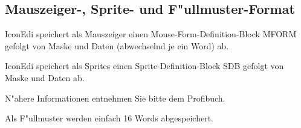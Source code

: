 \begin{appendix}
\subsection{Mauszeiger-, Sprite- und F"ullmuster-Format}
IconEdi speichert als Mauszeiger einen 
Mouse-Form-Definition-Block MFORM gefolgt von Maske
und Daten (abwechselnd je ein Word) ab. 

IconEdi speichert als Sprites einen 
Sprite-Definition-Block SDB gefolgt von Maske
und Daten ab. 

N"ahere Informationen entnehmen Sie bitte dem Profibuch.

Als F"ullmuster werden einfach 16 Words abgespeichert.

\end{appendix}



